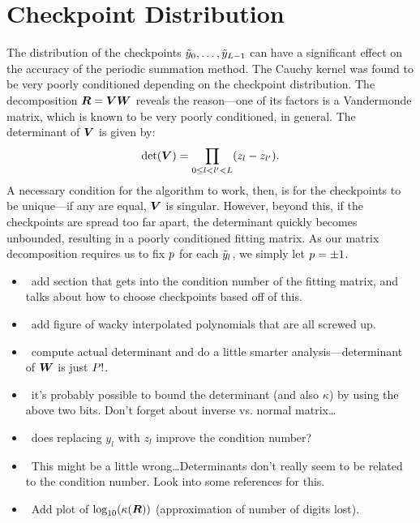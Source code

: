 \section{Checkpoint Distribution}

The distribution of the checkpoints
${\tilde{y}}_0, \hdots, {\tilde{y}}_{L-1}$ can have a significant
effect on the accuracy of the periodic summation method. The Cauchy
kernel was found to be very poorly conditioned depending on the
checkpoint distribution. The decomposition
$\boldsymbol{R} = \boldsymbol{V}\boldsymbol{W}$ reveals the reason---one of its
factors is a Vandermonde matrix, which is known to be very poorly
conditioned, in general. The determinant of $\boldsymbol{V}$ is given
by:
\begin{align}
  \det(\boldsymbol{V}) = \prod_{0 \leq l < l' < L} (z_l - z_{l'}).
\end{align}
A necessary condition for the algorithm to work, then, is for the
checkpoints to be unique---if any are equal, $\boldsymbol{V}$ is
singular. However, beyond this, if the checkpoints are spread too far
apart, the determinant quickly becomes unbounded, resulting in a
poorly conditioned fitting matrix. As our matrix decomposition
requires us to fix $p$ for each ${\tilde{y}}_l$, we simply let
$p = \pm 1$.

\begin{itemize}
\item \TODO\ add section that gets into the condition number of the
  fitting matrix, and talks about how to choose checkpoints based off
  of this.
\item \TODO\ add figure of wacky interpolated polynomials that are all
  screwed up.
\item \TODO\ compute actual determinant and do a little smarter
  analysis---determinant of $\boldsymbol{W}$ is just $P!$.
\item \TODO\ it's probably possible to bound the determinant (and also
  $\kappa$) by using the above two bits. Don't forget about inverse
  vs. normal matrix\ldots
\item \TODO\ does replacing $y_l$ with $z_l$ improve the condition
  number?
\item \TODO\ This might be a little wrong\ldots Determinants don't really
  seem to be related to the condition number. Look into some
  references for this.
\item \TODO\ Add plot of $\log_{10}(\kappa(\boldsymbol{R}))$ (approximation of
  number of digits lost).
\end{itemize}

